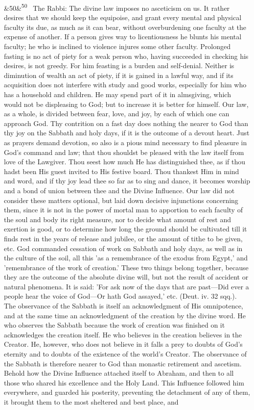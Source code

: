 \documentclass[12pt]{article}
\newcommand{\para}[1][]{\par\noindent\ifx&#1&\else\textsuperscript{\footnotesize #1}~\fi}
\begin{document}
\para[50] The Rabbi: The divine law imposes no asceticism on us. It rather desires that we should keep the equipoise, and grant every mental and physical faculty its due, as much as it can bear, without overburdening one faculty at the expense of another. If a person gives way to licentiousness he blunts his mental faculty; he who is inclined to violence injures some other faculty. Prolonged fasting is no act of piety for a weak person who, having succeeded in checking his desires, is not greedy. For him feasting is a burden and self-denial. Neither is diminution of wealth an act of piety, if it is gained in a lawful way, and if its acquisition does not interfere with study and good works, especially for him who has a household and children. He may spend part of it in almsgiving, which would not be displeasing to God; but to increase it is better for himself. Our law, as a whole, is divided between fear, love, and joy, by each of which one can approach God. Thy contrition on a fast day does nothing the nearer to God than thy joy on the Sabbath and holy days, if it is the outcome of a devout heart. Just as prayers demand devotion, so also is a pious mind necessary to find pleasure in God's command and law; that thou shouldst be pleased with the law itself from love of the Lawgiver. Thou seest how much He has distinguished thee, as if thou hadst been His guest invited to His festive board. Thou thankest Him in mind and word, and if thy joy lead thee so far as to sing and dance, it becomes worship and a bond of union between thee and the Divine Influence. Our law did not consider these matters optional, but laid down decisive injunctions concerning them, since it is not in the power of mortal man to apportion to each faculty of the soul and body its right measure, nor to decide what amount of rest and exertion is good, or to determine how long the ground should be cultivated till it finds rest in the years of release and jubilee, or the amount of tithe to be given, etc. God commanded cessation of work on Sabbath and holy days, as well as in the culture of the soil, all this 'as a remembrance of the exodus from Egypt,' and 'remembrance of the work of creation.' These two things belong together, because they are the outcome of the absolute divine will, but not the result of accident or natural phenomena. It is said: 'For ask now of the days that are past---Did ever a people hear the voice of God---Or hath God assayed,' etc. (Deut. iv. 32 sqq.). The observance of the Sabbath is itself an acknowledgment of His omnipotence, and at the same time an acknowledgment of the creation by the divine word. He who observes the Sabbath because the work of creation was finished on it acknowledges the creation itself. He who believes in the creation believes in the Creator. He, however, who does not believe in it falls a prey to doubts of God's eternity and to doubts of the existence of the world's Creator. The observance of the Sabbath is therefore nearer to God than monastic retirement and ascetism. Behold how the Divine Influence attached itself to Abraham, and then to all those who shared his excellence and the Holy Land. This Influence followed him everywhere, and guarded his posterity, preventing the detachment of any of them, it brought them to the most sheltered and best place, and 
\end{document}
